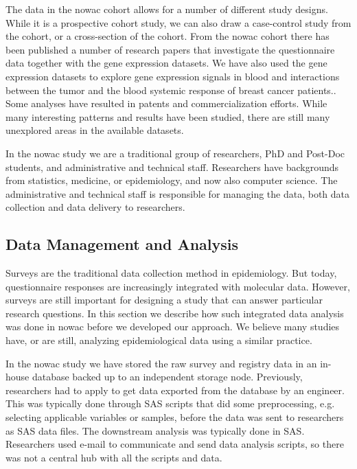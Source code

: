 The data in the \gls{nowac} cohort allows for a number of different study
designs. While it is a prospective cohort study, we can also draw a case-control
study from the cohort, or a cross-section of the cohort. From the
\gls{nowac} cohort there has been published a number of research papers that
investigate the questionnaire data together with the gene expression
datasets.\cite{olsen2013plasma,dumeaux2010deciphering}  We have also used the
gene expression datasets to explore gene expression signals in blood and
interactions between the tumor and the blood systemic response of breast cancer
patients.\cite{holden2017local, dumeaux2017interactions}. Some analyses have
resulted in patents\cite{blobrec} and commercialization efforts.  While many
interesting patterns and results have been studied, there are still many
unexplored areas in the available datasets.

In the \gls{nowac} study we are a traditional group of researchers, PhD and
Post-Doc students, and administrative and technical staff. Researchers have
backgrounds from statistics, medicine, or epidemiology, and now also computer
science. The administrative and technical staff is responsible for managing the
data, both data collection and data delivery to researchers. 

\subsection{Data Management and Analysis} 
Surveys are the traditional data collection method in epidemiology. But
today, questionnaire responses are increasingly integrated with molecular data.
However, surveys are still important for designing a study that can answer
particular research questions.  In this section we describe how such integrated
data analysis was done in \gls{nowac} before we developed our approach. We
believe many studies have, or are still, analyzing epidemiological data using
a similar practice. 

In the \gls{nowac} study we have stored the raw survey and registry data in an
in-house database backed up to an independent storage node. Previously,
researchers had to apply to get data exported from the database by an engineer.
This was typically done through SAS scripts that did some preprocessing, e.g.
selecting applicable variables or samples, before the data was sent to
researchers as SAS data files. The downstream analysis was typically done in
SAS. Researchers used e-mail to communicate and send data analysis scripts, so
there was not a central hub with all the scripts and data. 


